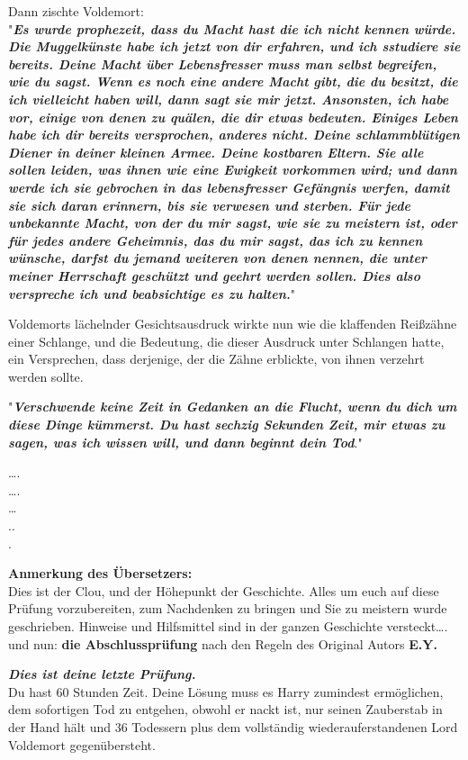 {Dann zischte Voldemort:\\ "\textbf{\emph{Es wurde prophezeit, dass du Macht hast die ich nicht kennen würde. Die Muggelkünste habe ich jetzt von dir erfahren, und ich sstudiere sie bereits. Deine Macht über Lebensfresser muss man selbst begreifen, wie du sagst. Wenn es noch eine andere Macht gibt, die du besitzt, die ich vielleicht haben will, dann sagt sie mir jetzt. Ansonsten, ich habe vor, einige von denen zu quälen, die dir etwas bedeuten. Einiges Leben habe ich dir bereits versprochen, anderes nicht. Deine schlammblütigen Diener in deiner kleinen Armee. Deine kostbaren Eltern. Sie alle sollen leiden, was ihnen wie eine Ewigkeit vorkommen wird; und dann werde ich sie gebrochen in das lebensfresser Gefängnis werfen, damit sie sich daran erinnern, bis sie verwesen und sterben. Für jede unbekannte Macht, von der du mir sagst, wie sie zu meistern ist, oder für jedes andere Geheimnis, das du mir sagst, das ich zu kennen wünsche, darfst du jemand weiteren von denen nennen, die unter meiner Herrschaft geschützt und geehrt werden sollen. Dies also verspreche ich und beabsichtige es zu halten.}}"

Voldemorts lächelnder Gesichtsausdruck wirkte nun wie die klaffenden Reißzähne einer Schlange, und die Bedeutung, die dieser Ausdruck unter Schlangen hatte, ein Versprechen, dass derjenige, der die Zähne erblickte, von ihnen verzehrt werden sollte.

"\textbf{\emph{Verschwende keine Zeit in Gedanken an die Flucht, wenn du dich um diese Dinge kümmerst. Du hast sechzig Sekunden Zeit, mir etwas zu sagen, was ich wissen will, und dann beginnt dein Tod}}."

….\\ ….\\ …\\ ..\\ .

\textbf{Anmerkung des Übersetzers:}\\ Dies ist der Clou, und der Höhepunkt der Geschichte. Alles um euch auf diese Prüfung vorzubereiten, zum Nachdenken zu bringen und Sie zu meistern wurde geschrieben. Hinweise und Hilfsmittel sind in der ganzen Geschichte versteckt…. und nun: \textbf{die Abschlussprüfung} nach den Regeln des Original Autors \textbf{E.Y.}

\emph{\hfill\break \textbf{Dies ist deine letzte Prüfung.}}\\ Du hast 60 Stunden Zeit. Deine Lösung muss es Harry zumindest ermöglichen, dem sofortigen Tod zu entgehen, obwohl er nackt ist, nur seinen Zauberstab in der Hand hält und 36 Todessern plus dem vollständig wiederauferstandenen Lord Voldemort gegenübersteht.

}
